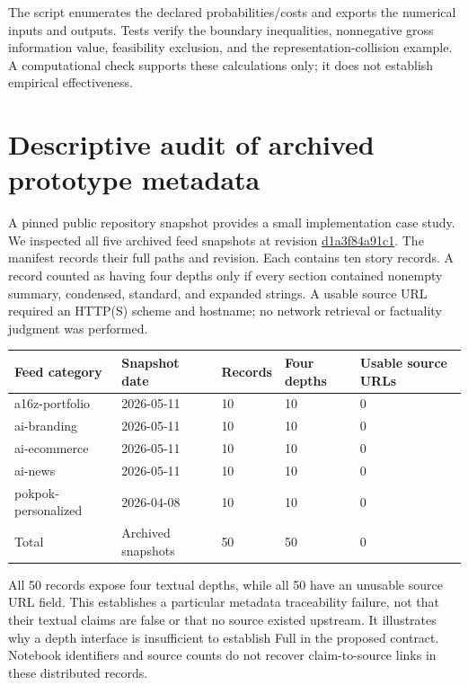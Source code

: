 \documentclass[11pt]{article}
\begin{document}
The script enumerates the declared probabilities/costs and exports the numerical inputs and outputs. Tests verify the boundary inequalities, nonnegative gross information value, feasibility exclusion, and the representation-collision example. A computational check supports these calculations only; it does not establish empirical effectiveness.

\section{Descriptive audit of archived prototype metadata}

A pinned public repository snapshot provides a small implementation case study. We inspected all five archived feed snapshots at revision \href{https://github.com/xclv-ai/nubble-me/tree/d1a3f84a91c1616f0bdb9935f97b5c7ef7071f7a}{d1a3f84a91c1}. The manifest records their full paths and revision. Each contains ten story records. A record counted as having four depths only if every section contained nonempty summary, condensed, standard, and expanded strings. A usable source URL required an HTTP(S) scheme and hostname; no network retrieval or factuality judgment was performed.

\begin{center}
\small
\begin{tabularx}{\linewidth}{@{}XXXXX@{}}
\toprule
Feed category & Snapshot date & Records & Four depths & Usable source URLs \\
\midrule
a16z-portfolio & 2026-05-11 & 10 & 10 & 0 \\
ai-branding & 2026-05-11 & 10 & 10 & 0 \\
ai-ecommerce & 2026-05-11 & 10 & 10 & 0 \\
ai-news & 2026-05-11 & 10 & 10 & 0 \\
pokpok-personalized & 2026-04-08 & 10 & 10 & 0 \\
Total & Archived snapshots & 50 & 50 & 0 \\
\bottomrule
\end{tabularx}
\end{center}

All 50 records expose four textual depths, while all 50 have an unusable source URL field. This establishes a particular metadata traceability failure, not that their textual claims are false or that no source existed upstream. It illustrates why a depth interface is insufficient to establish Full in the proposed contract. Notebook identifiers and source counts do not recover claim-to-source links in these distributed records.
\end{document}
